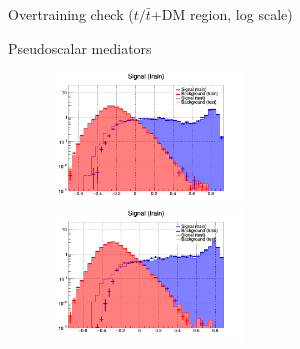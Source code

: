 \documentclass[8pt]{beamer}
\begin{document}
\begin{frame}{Overtraining check ($t/\bar t$+DM region, log scale)}
\vspace{-5pt}
\begin{block}{\centering Pseudoscalar mediators}\end{block} \vspace{-10pt}
\begin{figure}[htbp]
\centering
\begin{minipage}[b]{.49\textwidth}
\begin{center}
\includegraphics[width=5.2cm, height=3.5cm]{figs/log_pseudo_overtraining_100GeV_ST.png}
\end{center}
\end{minipage}\hfill
\begin{minipage}[b]{.49\textwidth}
\begin{center}
\includegraphics[width=5.2cm, height=3.5cm]{figs/log_pseudo_overtraining_500GeV_ST.png}
\end{center}
\end{minipage} \hfill
\end{figure} \vfill
\end{frame}
\end{document}

